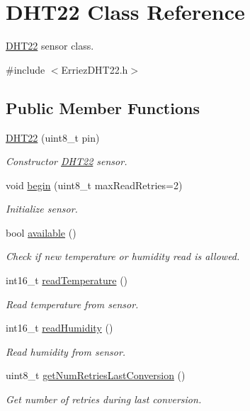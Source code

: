 \hypertarget{class_d_h_t22}{}\section{D\+H\+T22 Class Reference}
\label{class_d_h_t22}


\hyperlink{class_d_h_t22}{D\+H\+T22} sensor class.  




{\ttfamily \#include $<$Erriez\+D\+H\+T22.\+h$>$}

\subsection*{Public Member Functions}
\begin{DoxyCompactItemize}
\item 
\hyperlink{class_d_h_t22_a6983635331e939d679888b4a936e0f53}{D\+H\+T22} (uint8\+\_\+t pin)
\begin{DoxyCompactList}\small\item\em Constructor \hyperlink{class_d_h_t22}{D\+H\+T22} sensor. \end{DoxyCompactList}\item 
void \hyperlink{class_d_h_t22_aefd9abeac99adbf54a7ce9d0bd6e786e}{begin} (uint8\+\_\+t max\+Read\+Retries=2)
\begin{DoxyCompactList}\small\item\em Initialize sensor. \end{DoxyCompactList}\item 
bool \hyperlink{class_d_h_t22_a70b4c57d73f985e715bd523f15ccae25}{available} ()
\begin{DoxyCompactList}\small\item\em Check if new temperature or humidity read is allowed. \end{DoxyCompactList}\item 
int16\+\_\+t \hyperlink{class_d_h_t22_aeed4f98e419ffb07d3e4c09ebc10162c}{read\+Temperature} ()
\begin{DoxyCompactList}\small\item\em Read temperature from sensor. \end{DoxyCompactList}\item 
int16\+\_\+t \hyperlink{class_d_h_t22_a4ff2d9fac4b8ecf1d72f71bb861c8dcf}{read\+Humidity} ()
\begin{DoxyCompactList}\small\item\em Read humidity from sensor. \end{DoxyCompactList}\item 
uint8\+\_\+t \hyperlink{class_d_h_t22_a2a6202258c0705df3499b65a74a85067}{get\+Num\+Retries\+Last\+Conversion} ()
\begin{DoxyCompactList}\small\item\em Get number of retries during last conversion. \end{DoxyCompactList}\end{DoxyCompactItemize}


